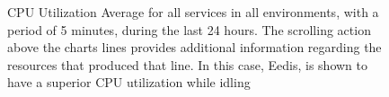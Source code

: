 \begin{figure}[!htbp]
    \centering
    \caption[AWS ECS Advanced Monitoring Example 3]{CPU Utilization Average for all services in all environments, with a period of 5 minutes, during the last 24 hours. The scrolling action above the charts lines provides additional information regarding the resources that produced that line. In this case, Eedis, is shown to have a superior CPU utilization while idling}
    \label{fig:ecs-example-03}
\end{figure} 
    